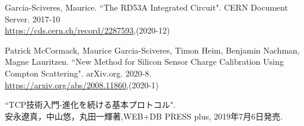 \begin{thebibliography}{9}
Garcia-Sciveres, Maurice. ``The RD53A Integrated Circuit". CERN Document Server. 2017-10\\
\url{https://cds.cern.ch/record/2287593},(2020-12)

Patrick McCormack, Maurice Garcia-Sciveres, Timon Heim, Benjamin Nachman, Magne Lauritzen. ``New Method for Silicon Sensor Charge Calibration Using Compton Scattering". arXiv.org. 2020-8.\\
\url{https://arxiv.org/abs/2008.11860},(2020-1)

``TCP技術入門-進化を続ける基本プロトコル".\\
安永遼真，中山悠，丸田一輝著,WEB+DB PRESS plus, 2019年7月6日発売.

\end{thebibliography}
